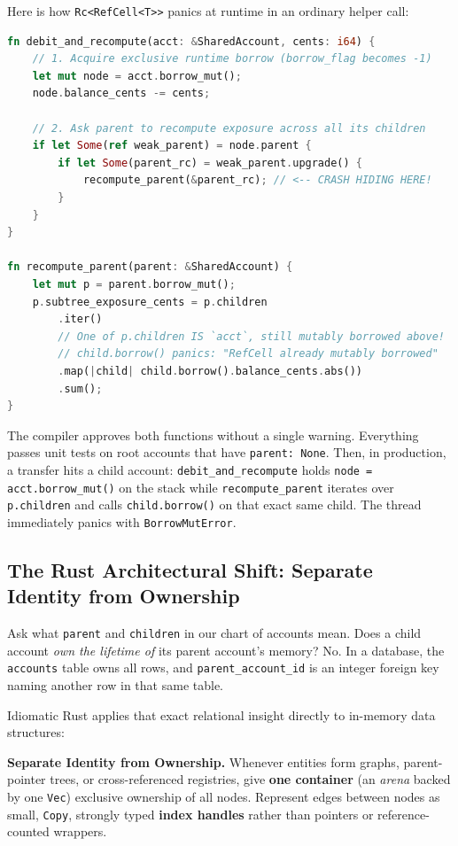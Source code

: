 \begin{trapbox}
Here is how \texttt{Rc<RefCell<T>>} panics at runtime in an ordinary helper call:
\begin{lstlisting}[language=Rust]
fn debit_and_recompute(acct: &SharedAccount, cents: i64) {
    // 1. Acquire exclusive runtime borrow (borrow_flag becomes -1)
    let mut node = acct.borrow_mut();
    node.balance_cents -= cents;

    // 2. Ask parent to recompute exposure across all its children
    if let Some(ref weak_parent) = node.parent {
        if let Some(parent_rc) = weak_parent.upgrade() {
            recompute_parent(&parent_rc); // <-- CRASH HIDING HERE!
        }
    }
}

fn recompute_parent(parent: &SharedAccount) {
    let mut p = parent.borrow_mut();
    p.subtree_exposure_cents = p.children
        .iter()
        // One of p.children IS `acct`, still mutably borrowed above!
        // child.borrow() panics: "RefCell already mutably borrowed"
        .map(|child| child.borrow().balance_cents.abs())
        .sum();
}
\end{lstlisting}
The compiler approves both functions without a single warning. Everything passes unit tests on root accounts that have \texttt{parent: None}. Then, in production, a transfer hits a child account: \texttt{debit\_and\_recompute} holds \texttt{node = acct.borrow\_mut()} on the stack while \texttt{recompute\_parent} iterates over \texttt{p.children} and calls \texttt{child.borrow()} on that exact same child. The thread immediately panics with \texttt{BorrowMutError}.
\end{trapbox}

\subsection{The Rust Architectural Shift: Separate Identity from Ownership}

Ask what \texttt{parent} and \texttt{children} in our chart of accounts mean. Does a child account \emph{own the lifetime of} its parent account's memory? No. In a database, the \texttt{accounts} table owns all rows, and \texttt{parent\_account\_id} is an integer foreign key naming another row in that same table.

Idiomatic Rust applies that exact relational insight directly to in-memory data structures:

\begin{focusbox}
\textbf{Separate Identity from Ownership.} Whenever entities form graphs, parent-pointer trees, or cross-referenced registries, give \textbf{one container} (an \emph{arena} backed by one \texttt{Vec}) exclusive ownership of all nodes. Represent edges between nodes as small, \texttt{Copy}, strongly typed \textbf{index handles} rather than pointers or reference-counted wrappers.
\end{focusbox}

